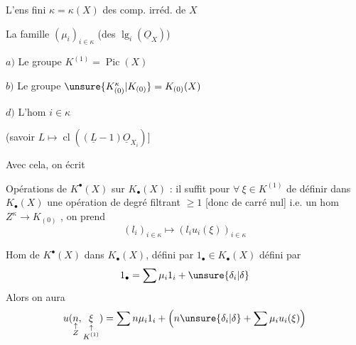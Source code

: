  L'ens fini $\kappa=\kappa(X)$ des comp. irréd. de $X$

 La famille $(\mu_i)_{i\in\kappa}$ (des $\operatorname{lg}_i(\underline O_X)$)

$a)$ Le groupe $K^{(1)}=\operatorname{Pic}(X)$

$b)$ Le groupe $\unsure{K_{(0)}^\kappa|K_{(0)}}=K_{(0)}(X)$
\deleted{$\unsure{i\in\kappa}\ [\unsure{K_{(0)}=\prod_{i\in\kappa}K_{(0)}^i}$}

$d)$ L'hom
 $i\in\kappa$

(savoir 
$L\longmapsto\operatorname{cl}((\underline L-1)\underline O_{X_i})$]

Avec cela, on écrit

Opérations de $K^\bullet(X)$ sur $K_\bullet(X)$ : il suffit pour
$\forall\ \xi\in K^{(1)}$ de définir dans $K_\bullet(X)$ une opération
de degré filtrant $\geq1$ [donc de carré nul]
i.e. un hom $Z^\kappa\longrightarrow K_{(0)}$
, on prend
\[
(l_i)_{i\in\kappa}\longmapsto(l_i u_i(\xi))_{i\in\kappa}
\]

Hom de $K^\bullet(X)$ dans $K_\bullet(X)$, défini par $1_\bullet\in K_\bullet(X)$
défini par
\[
1_\bullet=\sum\mu_i1_i+\unsure{\delta_i|\delta}
\]
Alors on aura
\[
u(\underset{\substack{\uparrow\\Z}}{n},\underset{\substack{\uparrow\\K^{(1)}}}{\xi})
=\sum n\mu_i1_i+\left(n\unsure{\delta_i|\delta}+\sum\mu_i u_i(\xi)\right)
\]

